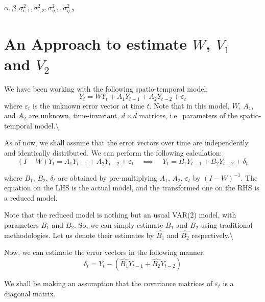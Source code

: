 \documentclass[
  12pt,
]{article}
\begin{document}
\(\alpha, \beta, \sigma^2_{\epsilon,1}, \sigma^2_{\epsilon,2}, \sigma^2_{\eta,1}, \sigma^2_{\eta,2}\)

\section{\textbf{\textcolor{DeepBlue}{An Approach to estimate $W$, $V_1$ and $V_2$}}}

We have been working with the following spatio-temporal model:
\[Y_t = W Y_t + A_1 Y_{t-1} + A_2 Y_{t-2} + \varepsilon_t\] where
\(\varepsilon_t\) is the unknown error vector at time \(t\). Note that
in this model, \(W\), \(A_1\), and \(A_2\) are unknown, time-invariant,
\(d \times d\) matrices, i.e.~parameters of the spatio-temporal
model.\textbackslash{}

As of now, we shall assume that the error vectors over time are
independently and identically distributed. We can perform the following
calculation:
\[(I - W) Y_t =  A_1 Y_{t-1} + A_2 Y_{t-2} + \varepsilon_t \quad\implies\quad Y_t =  B_1 Y_{t-1} + B_2 Y_{t-2} + \delta_t\]

where \(B_1\), \(B_2\), \(\delta_t\) are obtained by pre-multiplying
\(A_1\), \(A_2\), \(\varepsilon_t\) by \((I - W)^{-1}\). The equation on
the LHS is the actual model, and the transformed one on the RHS is a
reduced model.

Note that the reduced model is nothing but an usual VAR(2) model, with
parameters \(B_1\) and \(B_2\). So, we can simply estimate \(B_1\) and
\(B_2\) using traditional methodologies. Let us denote their estimates
by \(\hat{B_1}\) and \(\hat{B_2}\) respectively.\textbackslash{}

Now, we can estimate the error vectors in the following manner:
\[\delta_t = Y_t - (\hat{B_1} Y_{t-1} + \hat{B_2} Y_{t-2})\]

\begin{tcolorbox}
  We shall be making an assumption that the covariance matrices of $\varepsilon_t$ is a diagonal matrix. 
\end{tcolorbox}
\end{document}
